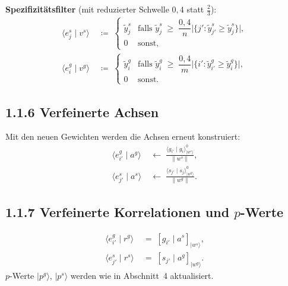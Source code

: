 \textbf{Spezifizit\"{a}tsfilter} (mit reduzierter Schwelle $0{,}4$
statt $\tfrac{2}{3}$):
\begin{align}
    \langle e^s_j \mid v^s \rangle
    &\;\coloneqq\;
    \begin{cases}
        \tilde{y}^s_j
        & \text{falls } \tilde{y}^s_j \;\geq\;
          \dfrac{0{,}4}{n}\bigl|\{j' : \tilde{y}^s_{j'} \geq \tilde{y}^s_j\}\bigr|,
        \\[4pt]
        0 & \text{sonst},
    \end{cases}
    \\[8pt]
    \langle e^g_i \mid v^g \rangle
    &\;\coloneqq\;
    \begin{cases}
        \tilde{y}^g_i
        & \text{falls } \tilde{y}^g_i \;\geq\;
          \dfrac{0{,}4}{m}\bigl|\{i' : \tilde{y}^g_{i'} \geq \tilde{y}^g_i\}\bigr|,
        \\[4pt]
        0 & \text{sonst}.
    \end{cases}
\end{align}
 
\subsection*{1.1.6 Verfeinerte Achsen}
 
Mit den neuen Gewichten werden die Achsen erneut konstruiert:
\begin{align}
    \langle e^g_{i'} \mid a^g \rangle
    &\;\leftarrow\;
    \frac{\langle g_{i'} \mid g_i \rangle^0_{|w^s\rangle}}{\|w^s\|},
    \\[4pt]
    \langle e^s_{j'} \mid a^s \rangle
    &\;\leftarrow\;
    \frac{\langle s_{j'} \mid s_j \rangle^0_{|w^g\rangle}}{\|w^g\|}.
\end{align}
 
\subsection*{1.1.7 Verfeinerte Korrelationen und $p$-Werte}
 
\begin{align}
    \langle e^g_{i'} \mid r^g \rangle
    &\;=\; [g_{i'} \mid a^s]_{|w^s\rangle},
    \\[4pt]
    \langle e^s_{j'} \mid r^s \rangle
    &\;=\; [s_{j'} \mid a^g]_{|w^g\rangle}.
\end{align}
$p$-Werte $|p^g\rangle$, $|p^s\rangle$ werden wie in Abschnitt~4
aktualisiert.
 
